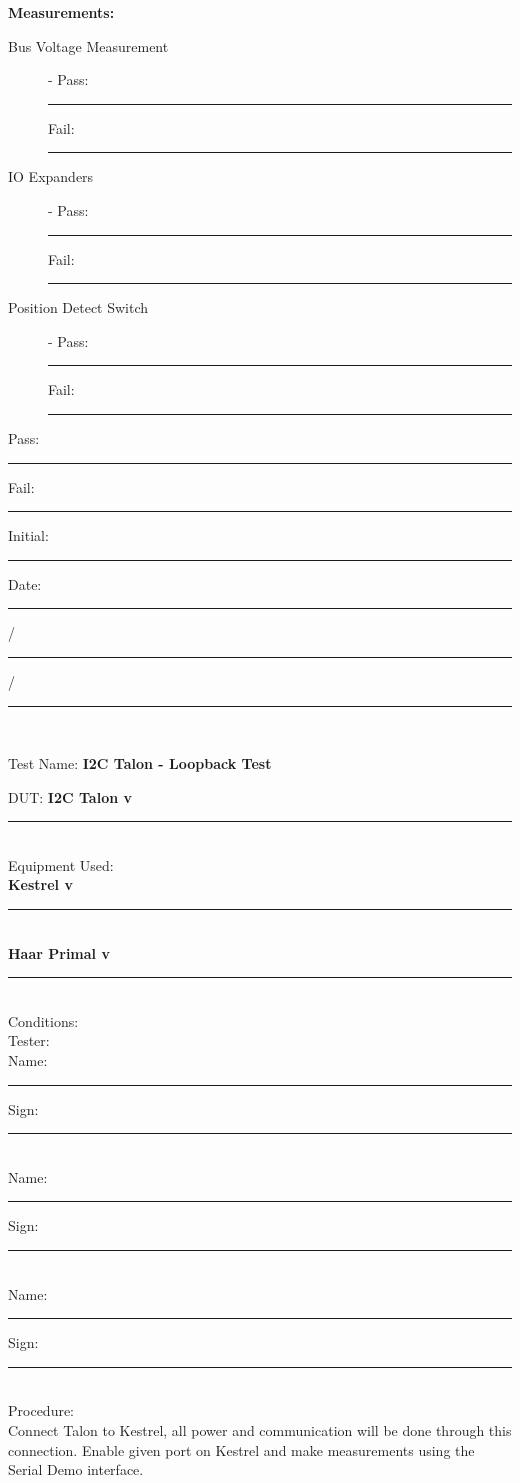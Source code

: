 {\Large \textbf{Measurements:}}\\[5pt]
\begin{description}
\item [Bus Voltage Measurement] -  \hfill Pass: \rule{1cm}{0.15mm} \hspace{0.5cm} Fail: \rule{1cm}{0.15mm}
\item [IO Expanders] -  \hfill Pass: \rule{1cm}{0.15mm} \hspace{0.5cm} Fail: \rule{1cm}{0.15mm}
\item [Position Detect Switch] -  \hfill Pass: \rule{1cm}{0.15mm} \hspace{0.5cm} Fail: \rule{1cm}{0.15mm}
\end{description}

\vfill

{\large Pass: \rule{1cm}{0.15mm} \hspace{1cm} Fail: \rule{1cm}{0.15mm}} \hfill Initial: \rule{2cm}{0.15mm} \hspace{1cm} Date: \rule{0.5cm}{0.15mm}/\rule{0.5cm}{0.15mm}/\rule{1cm}{0.15mm}\\[5pt]

\pagebreak

{\Huge Test Name: \textbf{I2C Talon - Loopback Test}}\\[20pt]
{\Large DUT: \textbf{I2C Talon v}\rule{1cm}{0.15mm}} \\[10pt]
{\Large Equipment Used: }\\[5pt]
\textbf{Kestrel v}\rule{1cm}{0.15mm}\\
\textbf{Haar Primal v}\rule{1cm}{0.15mm}\\[40pt]
{\Large Conditions: }\\[40pt]
{\Large Tester: }\\[10pt]
Name: \rule{4cm}{0.15mm} \hfill Sign: \rule{4cm}{0.15mm}\\[5pt]
Name: \rule{4cm}{0.15mm} \hfill Sign: \rule{4cm}{0.15mm}\\[5pt]
Name: \rule{4cm}{0.15mm} \hfill Sign: \rule{4cm}{0.15mm}\\[15pt]
{\Large Procedure: }\\
Connect Talon to Kestrel, all power and communication will be done through this connection. Enable given port on Kestrel and make measurements using the Serial Demo interface. 

